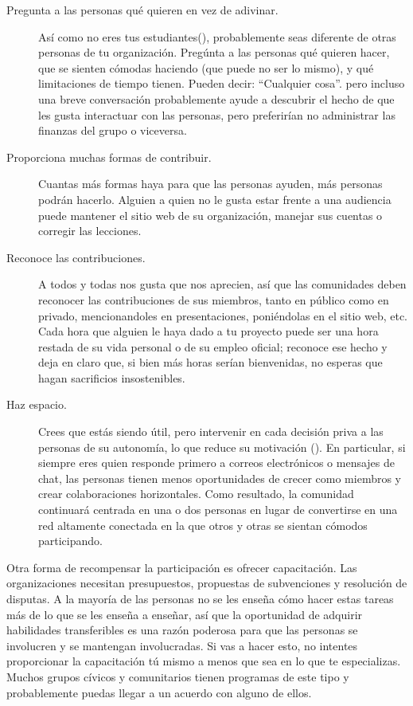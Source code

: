 \begin{description}

\item[Pregunta a las personas qué quieren en vez de adivinar.]
  Así como no eres tus estudiantes(),
  probablemente seas diferente de otras personas de tu organización.
  Pregúnta a las personas qué quieren hacer,
  que se sienten cómodas haciendo (que puede no ser lo mismo),
  y qué limitaciones de tiempo tienen.
  Pueden decir: ``Cualquier cosa''.
  pero incluso una breve conversación probablemente ayude a descubrir el hecho de que
  les gusta interactuar con las personas, pero preferirían no administrar las finanzas del grupo
  o viceversa.

\item[Proporciona muchas formas de contribuir.]
    Cuantas más formas haya para que las personas ayuden, más personas podrán hacerlo.
  Alguien a quien no le gusta estar frente a una audiencia
  puede mantener el sitio web de su organización,
  manejar sus cuentas
  o corregir las lecciones.

\item[Reconoce las contribuciones.]
  A todos y todas nos gusta que nos aprecien,
  así que las comunidades deben reconocer las contribuciones
  de sus miembros, tanto en público como en privado,
  mencionandoles en presentaciones,
  poniéndolas en el sitio web, etc.
  Cada hora que alguien le haya dado a tu proyecto
  puede ser una hora restada de su vida personal o de su empleo oficial;
  reconoce ese hecho
  y deja en claro que, si bien más horas serían bienvenidas,
  no esperas que hagan sacrificios insostenibles.

\item[Haz espacio.]
  Crees que estás siendo útil,
  pero intervenir en cada decisión priva a las personas de su autonomía,
  lo que reduce su motivación ().
  En particular, si siempre eres quien responde primero a correos electrónicos o mensajes de chat,
  las personas tienen menos oportunidades de crecer como miembros
  y crear colaboraciones horizontales.
  Como resultado,
  la comunidad continuará centrada en una o dos personas
  en lugar de convertirse en una red altamente conectada
  en la que otros y otras se sientan cómodos participando.

\end{description}

Otra forma de recompensar la participación es ofrecer capacitación.
Las organizaciones necesitan presupuestos, propuestas de subvenciones y resolución de disputas.
A la mayoría de las personas no se les enseña cómo hacer estas tareas más de lo que se les enseña a enseñar,
así que la oportunidad de adquirir habilidades transferibles
es una razón poderosa para que las personas se involucren y se mantengan involucradas.
Si vas a hacer esto, no intentes proporcionar la capacitación tú mismo
a menos que sea en lo que te especializas.
Muchos grupos cívicos y comunitarios tienen programas de este tipo
y probablemente puedas llegar a un acuerdo con alguno de ellos.


